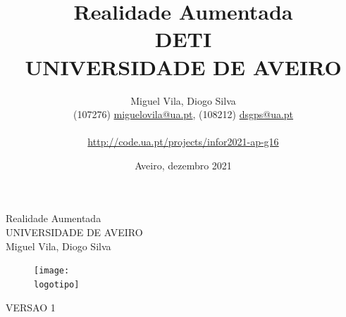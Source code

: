 \documentclass{report}
\begin{document}
\def\titulo{Realidade Aumentada}
\def\data{Aveiro, dezembro 2021}
\def\autores{Miguel Vila, Diogo Silva}
\def\autorescontactos{(107276) \href{mailto:miguelovila@ua.pt}{miguelovila@ua.pt}, (108212) \href{mailto:dsgps@ua.pt}{dsgps@ua.pt}}
\def\projetocodeua{\url{http://code.ua.pt/projects/infor2021-ap-g16}}
\def\versao{VERSAO 1}
\def\departamento{DETI}
\def\empresa{UNIVERSIDADE DE AVEIRO}
\def\logotipo{ua.pdf}

\begin{titlepage}
\begin{center}
\vspace*{50mm}
{\Huge \titulo}\\ 
\vspace{10mm}
{\Large \empresa}\\
\vspace{10mm}
{\LARGE \autores}\\ 
\vspace{30mm}
\begin{figure}[h]
\center
\texttt{[image: \\logotipo]}
\end{figure}
\vspace{30mm}
\end{center}
\begin{flushright}
\versao
\end{flushright}
\end{titlepage}

\title{%
{\Huge\textbf{\titulo}}\\
{\Large \departamento\\ \empresa}
}
\author{
    \autores \\
    \autorescontactos \\\\
    \projetocodeua
}
\date{\data}
\maketitle
{}
\end{document}
